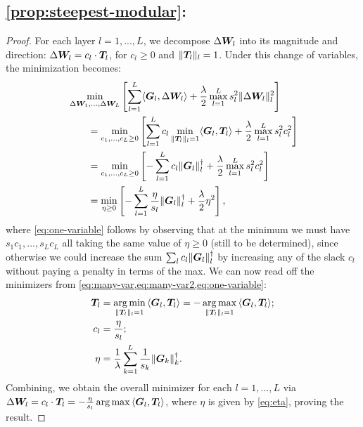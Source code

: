 \subsection*{\cref{prop:steepest-modular}: } \label{proof:steepest-modular}


\begin{proof}
For each layer $l=1,...,L$, we decompose $\Delta{\bm{W}}_l$ into its magnitude and direction: $\Delta {\bm{W}}_l = c_l \cdot {\bm{T}}_l$, for $c_l \geq 0$ and $\Vert {{\bm{T}}_l} \Vert_l = 1$. Under this change of variables, the minimization becomes:
\begin{align}
    &\min_{\Delta {\bm{W}}_1, \dots, \Delta {\bm{W}}_L} \left[ \sum_{l=1}^L \langle {\bm{G}}_l, \Delta {\bm{W}}_l \rangle + \frac{\lambda}{2} \max_{l=1}^L s_l^2 \Vert {\Delta{\bm{W}}_l} \Vert_l^2 \right] \\
    &\qquad= \min_{c_1, \dots, c_L \geq 0} \left[ \sum_{l=1}^L c_l \min_{\Vert {{\bm{T}}_l} \Vert_l=1} \langle {\bm{G}}_l, {\bm{T}}_l \rangle + \frac{\lambda}{2} \max_{l=1}^L s_l^2 c_l^2 \right] \label{eq:many-var}\\
    &\qquad= \min_{c_1, \dots, c_L \geq 0} \left[ -\sum_{l=1}^L c_l \Vert {{\bm{G}}_l} \Vert_l^\dagger + \frac{\lambda}{2} \max_{l=1}^L s_l^2 c_l^2 \right]\label{eq:many-var2}\\
    &\qquad= \min_{\eta\geq 0} \left[ -\sum_{l=1}^L \frac{\eta}{s_l} \Vert {{\bm{G}}_l} \Vert_l^\dagger + \frac{\lambda}{2} \eta^2 \right], \label{eq:one-variable}
\end{align}
where \cref{eq:one-variable} follows by observing that at the minimum we must have $s_1 c_1, ..., s_L c_L$ all taking the same value of $\eta\geq 0$ (still to be determined), since otherwise we could increase the sum $\sum_l c_l \Vert {{\bm{G}}_l} \Vert_l^\dagger$ by increasing any of the slack $c_l$ without paying a penalty in terms of the max. We can now read off the minimizers from \cref{eq:many-var,eq:many-var2,eq:one-variable}:
\begin{align}
    {\bm{T}}_l &= \operatorname*{arg\,min}_{\Vert {{\bm{T}}_l} \Vert_l = 1} \, \langle {\bm{G}}_l, {\bm{T}}_l \rangle = - \operatorname*{arg\,max}_{\Vert {{\bm{T}}_l} \Vert_l = 1} \, \langle {\bm{G}}_l, {\bm{T}}_l \rangle; \\
    c_l &= \frac{\eta}{s_l}; \\
    \eta &= \frac{1}{\lambda} \sum_{k=1}^L \frac{1}{s_k} \Vert {{\bm{G}}_k} \Vert_k^\dagger. \label{eq:eta}
\end{align}
Combining, we obtain the overall minimizer for each $l=1,...,L$ via $\Delta {\bm{W}}_l = c_l \cdot {\bm{T}}_l = - \frac{\eta}{s_l} \operatorname*{arg\,max} \, \langle {\bm{G}}_l, {\bm{T}}_l \rangle$, where $\eta$ is given by \cref{eq:eta}, proving the result.
\end{proof}

